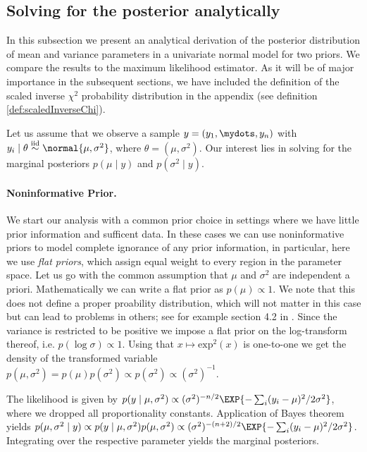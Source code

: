 \subsection{Solving for the posterior analytically}
In this subsection we present an analytical derivation of the posterior distribution of mean and variance parameters in a univariate normal model for two priors.
We compare the results to the maximum likelihood estimator.
As it will be of major importance in the subsequent sections, we have included the definition of the scaled inverse $\chi^2$ probability distribution in the appendix (see definition \ref{def:scaledInverseChi}).

Let us assume that we observe a sample $y = (y_1, \mydots, y_n)$
with $y_i \mid \theta \overset{\text{iid}}{\sim} \normal{\mu, \sigma^2}$, where $\theta = (\mu, \sigma^2)$.
Our interest lies in solving for the marginal posteriors $p(\mu \mid y)$ and $p(\sigma^2 \mid y)$.

\paragraph{Noninformative Prior.}
We start our analysis with a common prior choice in settings where we have little prior information and sufficent data.
In these cases we can use noninformative priors to model complete ignorance of any prior information, in particular, here we use \emph{flat priors}, which assign equal weight to every region in the parameter space.
Let us go with the common assumption that $\mu$ and $\sigma^2$ are independent a priori.
Mathematically we can write a flat prior as $p(\mu) \propto 1$.
We note that this does not define a proper proability distribution, which will not matter in this case but can lead to problems in others; see for example section 4.2 in \citet{kass1996}.
Since the variance is restricted to be positive we impose a flat prior on the log-transform thereof, i.e. $p(\log \sigma) \propto 1$.
Using that $x \mapsto \text{exp}^2(x)$ is one-to-one we get the density of the transformed variable $p(\mu, \sigma^2) = p(\mu)p(\sigma^2) \propto p(\sigma^2) \propto (\sigma^2)^{-1}$.

The likelihood is given by $p(y \mid \mu, \sigma^2) \propto (\sigma^2)^{-n/2} \EXP{-\sum_i (y_i - \mu)^2/2\sigma^2}$, where we dropped all proportionality constants.
Application of Bayes theorem yields $p(\mu, \sigma^2 \mid y) \propto p(y \mid \mu, \sigma^2) p(\mu, \sigma^2) \propto (\sigma^2)^{-(n+2)/2} \EXP{-\sum_i (y_i - \mu)^2/2\sigma^2}$.
Integrating over the respective parameter yields the marginal posteriors.

